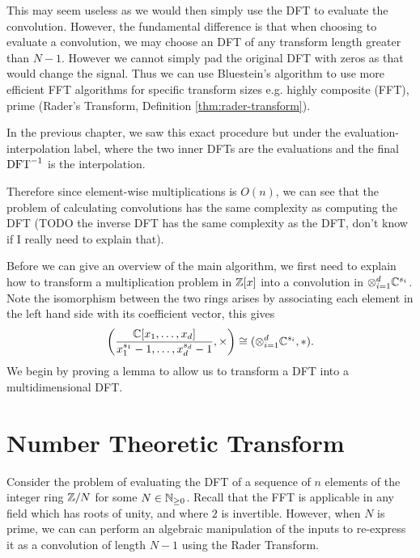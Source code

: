 This may seem useless as we would then simply use the DFT to evaluate the convolution. However, the fundamental difference is that when choosing to evaluate a convolution, we may choose an DFT of any transform length greater than $N - 1$. However we cannot simply pad the original DFT with zeros as that would change the signal. Thus we can use Bluestein's algorithm\cite{bluestein} to use more efficient FFT algorithms for specific transform sizes e.g. highly composite (FFT), prime (Rader's Transform, Definition \ref{thm:rader-transform}).


In the previous chapter, we saw this exact procedure but under the evaluation-interpolation label, where the two inner DFTs are the evaluations and the final $\textrm{DFT}^{-1}$ is the interpolation.

Therefore since element-wise multiplications is $O(n)$, we can see that the problem of calculating convolutions has the same complexity as computing the DFT (TODO the inverse DFT has the same complexity as the DFT, don't know if I really need to explain that).

Before we can give an overview of the main algorithm, we first need to explain how to transform a multiplication problem in ${\mathbb Z}[x]$ into a convolution in $\otimes_{i=1}^{d} {\mathbb C}^{s_i}$.\\
Note the isomorphism between the two rings arises by associating each element in the left hand side with its coefficient vector, this gives
\begin{equation}\label{eq:mult-to-convolution}
    \left(\frac{{\mathbb C}[x_1, \ldots, x_d]}{x_1^{s_1} - 1, \ldots, x_d^{s_d} - 1}, \times\right) \cong (\otimes_{i=1}^d {\mathbb C}^{s_i}, \ast).
\end{equation}
We begin by proving a lemma to allow us to transform a DFT into a multidimensional DFT.






\section{Number Theoretic Transform}
\label{sec:ntt}


Consider the problem of evaluating the DFT of a sequence of $n$ elements of the integer ring ${\mathbb Z}/N$ for some $N \in {\mathbb N}_{\ge 0}$. Recall that the FFT is applicable in any field which has roots of unity, and where $2$ is invertible. However, when $N$ is prime, we can can perform an algebraic manipulation of the inputs to re-express it as a convolution of length $N-1$ using the Rader Transform.


